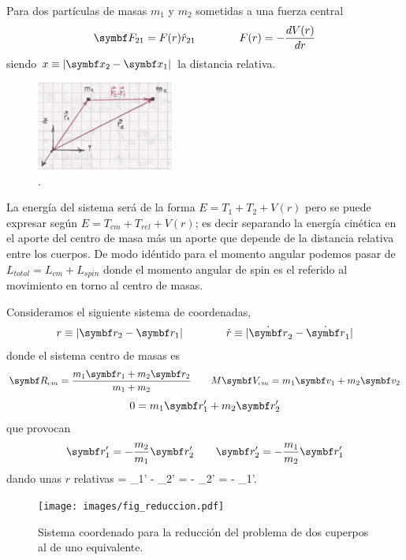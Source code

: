 \documentclass[10pt,oneside]{CBFT_book}
\begin{document}
Para dos partículas de masas $ m_1 $ y $ m_2 $ sometidas a una fuerza central 
\[
	\vb{F}_{21} = F(r) \hat{r}_{21} \qquad \qquad F(r) = -\dtot{V(r)}{r}
\]
siendo $x \equiv |\vb{x}_2-\vb{x}_1|$ la distancia relativa.

\begin{figure}[hbt]
	\begin{center}
	\includegraphics[width=0.4\textwidth]{images/fig_mc_prob_equiv_scheme.pdf}	 
	\end{center}
	\caption{.}
	\label{fig_mc_prob_equiv_scheme}
\end{figure} 

La energía del sistema será de la forma  $ E = T_1 + T_2 + V(r) $ pero se puede expresar según 
$ E = T_{cm} + T_{rel} + V(r) $; es decir separando la energía cinética en el aporte del centro de
masa más un aporte que depende de la distancia relativa entre los cuerpos.
De modo idéntido para el momento angular podemos pasar de $ L_{total} = L_{cm} + L_{spin} $ donde el
momento angular de spin es el referido al movimiento en torno al centro de masas.

Consideramos el siguiente sistema de coordenadas,
\[
	r \equiv | \vb{r}_2 - \vb{r}_1 | \qquad	\qquad  \dot{r} \equiv | \dot{\vb{r}}_2 - \dot{\vb{r}}_1 |
\]
donde el sistema centro de masas es
\[
	\vb{R}_{cm} = \frac{ m_1\vb{r}_1 + m_2\vb{r}_2 }{ m_1 + m_2 }	\qquad 
	M \vb{V}_{cm} =  m_1\vb{v}_1 + m_2\vb{v}_2 
\]
\[
	0 = m_1\vb{r}_1' + m_2\vb{r}_2'
\]
que provocan
\[
	\vb{r}_1' = -\frac{m_2}{m_1}\vb{r}_2' \qquad   \vb{r}_2' = -\frac{m_1}{m_2}\vb{r}_1' 
\]
dando unas $r$ relativas
\be
	 = _1' - _2' = - _2' = - _1'.
	\label{r_relativas}
\ee

\begin{figure}[hbt]
	\begin{center}
	\texttt{[image: images/fig\_reduccion.pdf]}	 
	\end{center}
	\caption{Sistema coordenado para la reducción del problema de dos cuperpos al de uno equivalente.}
\end{figure} 
\end{document}
